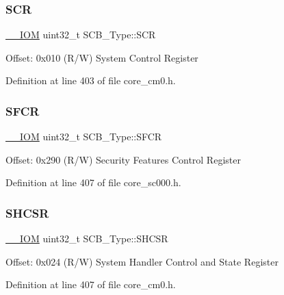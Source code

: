 \mbox{\label{struct_s_c_b___type_a3a4840c6fa4d1ee75544f4032c88ec34}} 
\subsubsection{\texorpdfstring{S\+CR}{SCR}}
{\footnotesize\ttfamily \hyperlink{core__sc300_8h_ab6caba5853a60a17e8e04499b52bf691}{\+\_\+\+\_\+\+I\+OM} uint32\+\_\+t S\+C\+B\+\_\+\+Type\+::\+S\+CR}

Offset\+: 0x010 (R/W) System Control Register 

Definition at line 403 of file core\+\_\+cm0.\+h.

\mbox{\label{struct_s_c_b___type_a82273352d2e8c7a28a7b7cbdfc3d6a75}} 
\subsubsection{\texorpdfstring{S\+F\+CR}{SFCR}}
{\footnotesize\ttfamily \hyperlink{core__sc300_8h_ab6caba5853a60a17e8e04499b52bf691}{\+\_\+\+\_\+\+I\+OM} uint32\+\_\+t S\+C\+B\+\_\+\+Type\+::\+S\+F\+CR}

Offset\+: 0x290 (R/W) Security Features Control Register 

Definition at line 407 of file core\+\_\+sc000.\+h.

\mbox{\label{struct_s_c_b___type_a7b5ae9741a99808043394c4743b635c4}} 
\subsubsection{\texorpdfstring{S\+H\+C\+SR}{SHCSR}}
{\footnotesize\ttfamily \hyperlink{core__sc300_8h_ab6caba5853a60a17e8e04499b52bf691}{\+\_\+\+\_\+\+I\+OM} uint32\+\_\+t S\+C\+B\+\_\+\+Type\+::\+S\+H\+C\+SR}

Offset\+: 0x024 (R/W) System Handler Control and State Register 

Definition at line 407 of file core\+\_\+cm0.\+h.

